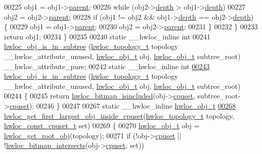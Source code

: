 \begin{DoxyCode}
{{00225       obj1 = obj1->\hyperlink{a00016_adc494f6aed939992be1c55cca5822900}{parent};
00226     \textcolor{keywordflow}{while} (obj2->\hyperlink{a00016_a9d82690370275d42d652eccdea5d3ee5}{depth} > obj1->\hyperlink{a00016_a9d82690370275d42d652eccdea5d3ee5}{depth})
00227       obj2 = obj2->\hyperlink{a00016_adc494f6aed939992be1c55cca5822900}{parent};
00228     \textcolor{keywordflow}{if} (obj1 != obj2 && obj1->\hyperlink{a00016_a9d82690370275d42d652eccdea5d3ee5}{depth} == obj2->\hyperlink{a00016_a9d82690370275d42d652eccdea5d3ee5}{depth}) \{
00229       obj1 = obj1->\hyperlink{a00016_adc494f6aed939992be1c55cca5822900}{parent};
00230       obj2 = obj2->\hyperlink{a00016_adc494f6aed939992be1c55cca5822900}{parent};
00231     \}
00232   \}
00233   \textcolor{keywordflow}{return} obj1;
00234 \}
00235 
00240 \textcolor{keyword}{static} \_\_hwloc\_inline \textcolor{keywordtype}{int}
00241 \hyperlink{a00053_ga08b5c1c1a95ed27a219c8af864690b3e}{hwloc_obj_is_in_subtree} (\hyperlink{a00039_ga9d1e76ee15a7dee158b786c30b6a6e38}{hwloc_topology_t} topology \_\_hwloc\_attribute\_unused, 
      \hyperlink{a00016}{hwloc_obj_t} obj, \hyperlink{a00016}{hwloc_obj_t} subtree\_root) \_\_hwloc\_attribute\_pure;
00242 \textcolor{keyword}{static} \_\_hwloc\_inline \textcolor{keywordtype}{int}
\hypertarget{a00031_source_l00243}{}\hyperlink{a00053_ga08b5c1c1a95ed27a219c8af864690b3e}{00243} \hyperlink{a00053_ga08b5c1c1a95ed27a219c8af864690b3e}{hwloc_obj_is_in_subtree} (\hyperlink{a00039_ga9d1e76ee15a7dee158b786c30b6a6e38}{hwloc_topology_t} topology \_\_hwloc\_attribute\_unused, 
      \hyperlink{a00016}{hwloc_obj_t} obj, \hyperlink{a00016}{hwloc_obj_t} subtree\_root)
00244 \{
00245   \textcolor{keywordflow}{return} \hyperlink{a00065_gaae29e14a926c198e8f91e6e4790621e7}{hwloc_bitmap_isincluded}(obj->\hyperlink{a00016_a67925e0f2c47f50408fbdb9bddd0790f}{cpuset}, subtree\_root->\hyperlink{a00016_a67925e0f2c47f50408fbdb9bddd0790f}{cpuset});
00246 \}
00247 
00267 \textcolor{keyword}{static} \_\_hwloc\_inline \hyperlink{a00016}{hwloc_obj_t}
\hypertarget{a00031_source_l00268}{}\hyperlink{a00054_gabcd5fa81a95fa5335950cae092277d5b}{00268} \hyperlink{a00054_gabcd5fa81a95fa5335950cae092277d5b}{hwloc_get_first_largest_obj_inside_cpuset}(\hyperlink{a00039_ga9d1e76ee15a7dee158b786c30b6a6e38}{hwloc_topology_t} topology, 
      \hyperlink{a00040_ga1f784433e9b606261f62d1134f6a3b25}{hwloc_const_cpuset_t} \textcolor{keyword}{set})
00269 \{
00270   \hyperlink{a00016}{hwloc_obj_t} obj = \hyperlink{a00053_gadbf58f6e187efbdb3cd9a8e30311b7d7}{hwloc_get_root_obj}(topology);
00271   \textcolor{keywordflow}{if} (!obj->\hyperlink{a00016_a67925e0f2c47f50408fbdb9bddd0790f}{cpuset} || !\hyperlink{a00065_ga575c27953709a8cb9a047aae65157526}{hwloc_bitmap_intersects}(obj->\hyperlink{a00016_a67925e0f2c47f50408fbdb9bddd0790f}{cpuset}, \textcolor{keyword}{set}))
}}
\end{DoxyCode}
